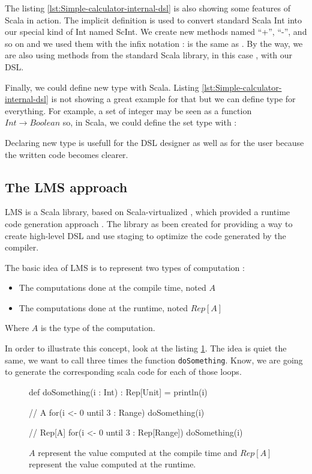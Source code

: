 The listing \ref{lst:Simple-calculator-internal-dsl} is also showing some
features of Scala in action. The implicit definition  is used to
convert standard Scala Int into our special kind of Int named ScInt. We create
new methods named ``+'', ``-'', and so on and we used them with the infix
notation :  is the same as . By the way,
we are also using methods from the standard Scala library, in this case
, with our \gls{DSL}.

Finally, we could define new type with Scala. Listing
\ref{lst:Simple-calculator-internal-dsl} is not showing a great example for that
but we can define type for everything. For example, a set of integer may be seen
as a function $Int \rightarrow Boolean$ so, in Scala, we could define the set
type with :


Declaring new type is usefull for the \gls{DSL} designer as well as for the user
because the written code becomes clearer.

\subsection{The LMS approach}
\label{subsec:lms_approach}

\gls{LMS} is a Scala library, based on Scala-virtualized \cite{Rompf2012}, which
provided a runtime code generation approach
\cite{Rompf:2010:LMS:1942788.1868314}. The library as been created for providing
a way to create high-level \gls{DSL} and use staging to optimize the code
generated by the compiler.

The basic idea of \gls{LMS} is to represent two types of computation :
\begin{itemize}
\item The computations done at the compile time, noted $A$
\item The computations done at the runtime, noted $Rep[A]$
\end{itemize}

Where $A$ is the type of the computation.

In order to illustrate this concept, look at the listing \ref{lst:lms-example}.
The idea is quiet the same, we want to call three times the function
{\normalsize \verb|doSomething|}. Know, we are going to generate the
corresponding scala code for each of those loops.

\begin{figure}[ht]
  \centering
\begin{scalacode}
def doSomething(i : Int) : Rep[Unit] = {
	println(i)
}

// A
for(i <- 0 until 3 : Range) {
	doSomething(i)
}

// Rep[A]
for(i <- 0 until 3 : Rep[Range]) {
	doSomething(i)
}
\end{scalacode}
  \caption[Difference between \(A\) and \(Rep\lbrack A\rbrack\) in a code example]{$A$ represent
    the value computed at the compile time and $Rep[A]$ represent the value
    computed at the runtime.}
  \label{lst:lms-example}
\end{figure}

